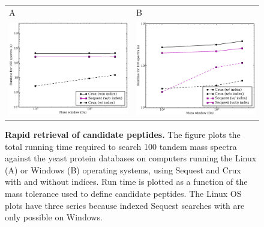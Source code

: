\documentclass{article}
\begin{document}
\begin{figure}
  \centering
  \begin{tabular}{ll}
    {\sf A} & {\sf B} \\
  \includegraphics[width=2.5in]{../../results/paper-figure/index/indexing-yeast.eps} &
  \includegraphics[width=2.5in]{../../results/paper-figure/turbo-no-missed/indexing-yeast-windows.eps} \\

\end{tabular}
  \caption{{\bf Rapid retrieval of candidate peptides.}  The figure
  plots the total running time required to search 100 tandem mass
  spectra against the yeast protein databases
  on computers running the Linux ({\sf A}) 
  or Windows ({\sf B}) operating systems, using {\sc Sequest} and Crux with 
  and without indices.
  Run time is plotted 
  as a function of the mass tolerance used to define candidate
  peptides. The Linux OS plots have three series
  because indexed {\sc Sequest} searches with are only possible on Windows.
  \label{figure:indexing}}
\end{figure}
\end{document}
